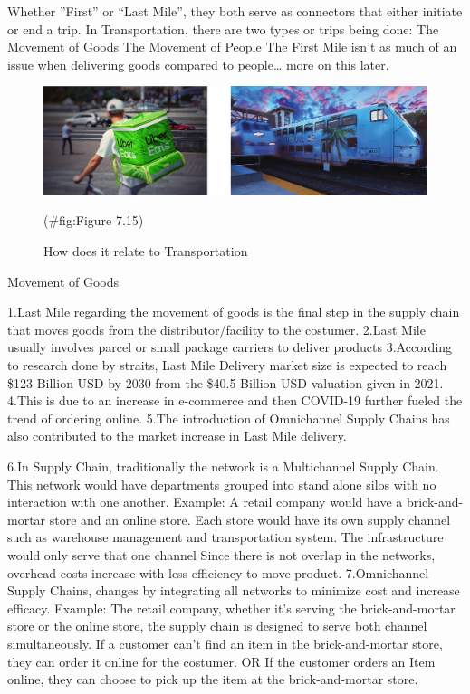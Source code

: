 \documentclass[
]{book}
\begin{document}
Whether ''First'' or ``Last Mile'', they both serve as connectors that either initiate or end a trip.
In Transportation, there are two types or trips being done:
The Movement of Goods
The Movement of People
The First Mile isn't as much of an issue when delivering goods compared to people\ldots{} more on this later.

\begin{figure}

{\centering \includegraphics{./Images/supplychain/How does it relate to Transportation} 

}

\caption{How does it relate to Transportation}(\#fig:Figure 7.15)
\end{figure}

Movement of Goods

1.Last Mile regarding the movement of goods is the final step in the supply chain that moves goods from the distributor/facility to the costumer.
2.Last Mile usually involves parcel or small package carriers to deliver products
3.According to research done by straits, Last Mile Delivery market size is expected to reach \$123 Billion USD by 2030 from the \$40.5 Billion USD valuation given in 2021.
4.This is due to an increase in e-commerce and then COVID-19 further fueled the trend of ordering online.
5.The introduction of Omnichannel Supply Chains has also contributed to the market increase in Last Mile delivery.

6.In Supply Chain, traditionally the network is a Multichannel Supply Chain. This network would have departments grouped into stand alone silos with no interaction with one another.
Example: A retail company would have a brick-and-mortar store and an online store. Each store would have its own supply channel such as warehouse management and transportation system. The infrastructure would only serve that one channel
Since there is not overlap in the networks, overhead costs increase with less efficiency to move product.
7.Omnichannel Supply Chains, changes by integrating all networks to minimize cost and increase efficacy.
Example: The retail company, whether it's serving the brick-and-mortar store or the online store, the supply chain is designed to serve both channel simultaneously.
If a customer can't find an item in the brick-and-mortar store, they can order it online for the costumer. OR If the customer orders an Item online, they can choose to pick up the item at the brick-and-mortar store.
\end{document}
